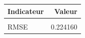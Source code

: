 \centering
\centering
\begin{tabular}[t]{lr}
\toprule
Indicateur & Valeur\\
\midrule
\cellcolor{gray!10}{EQM} & \cellcolor{gray!10}{0.050248}\\
RMSE & 0.224160\\
\bottomrule
\end{tabular}

